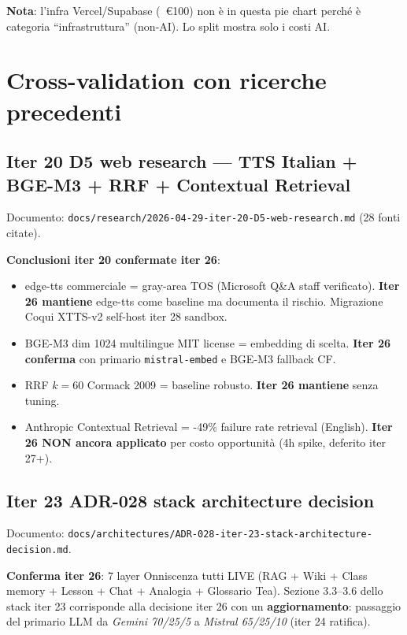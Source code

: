 \documentclass[12pt,a4paper]{article}
\begin{document}
\textbf{Nota}: l'infra Vercel/Supabase (~€100) non è in questa pie chart perché è categoria ``infrastruttura'' (non-AI). Lo split mostra solo i costi AI.

\newpage

\section{Cross-validation con ricerche precedenti}

\subsection{Iter 20 D5 web research --- TTS Italian + BGE-M3 + RRF + Contextual Retrieval}

Documento: \texttt{docs/research/2026-04-29-iter-20-D5-web-research.md} (28 fonti citate).

\textbf{Conclusioni iter 20 confermate iter 26}:
\begin{itemize}[leftmargin=*]
  \item edge-tts commerciale = gray-area TOS (Microsoft Q\&A staff verificato). \textbf{Iter 26 mantiene} edge-tts come baseline ma documenta il rischio. Migrazione Coqui XTTS-v2 self-host iter 28 sandbox.
  \item BGE-M3 dim 1024 multilingue MIT license = embedding di scelta. \textbf{Iter 26 conferma} con primario \texttt{mistral-embed} e BGE-M3 fallback CF.
  \item RRF $k=60$ Cormack 2009 = baseline robusto. \textbf{Iter 26 mantiene} senza tuning.
  \item Anthropic Contextual Retrieval = -49\% failure rate retrieval (English). \textbf{Iter 26 NON ancora applicato} per costo opportunità (4h spike, deferito iter 27+).
\end{itemize}

\subsection{Iter 23 ADR-028 stack architecture decision}

Documento: \texttt{docs/architectures/ADR-028-iter-23-stack-architecture-decision.md}.

\textbf{Conferma iter 26}: 7 layer Onniscenza tutti LIVE (RAG + Wiki + Class memory + Lesson + Chat + Analogia + Glossario Tea). Sezione 3.3--3.6 dello stack iter 23 corrisponde alla decisione iter 26 con un \textbf{aggiornamento}: passaggio del primario LLM da \emph{Gemini 70/25/5} a \emph{Mistral 65/25/10} (iter 24 ratifica).
\end{document}
